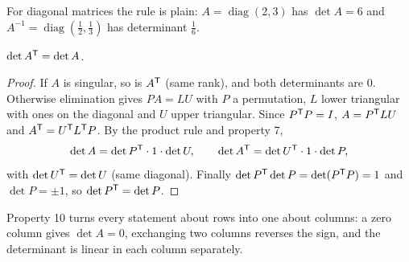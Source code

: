 For diagonal matrices the rule is plain: $A=\operatorname{diag}(2,3)$ has $\det A=6$ and
$A^{-1}=\operatorname{diag}(\frac12,\frac13)$ has determinant $\frac16$.

\begin{theorem}\label{thm:u20-transpose}
$\det A^{\mathsf{T}}=\det A$.
\end{theorem}

\begin{proof}
If $A$ is singular, so is $A^{\mathsf{T}}$ (same rank), and both determinants are $0$. Otherwise
elimination gives $PA=LU$ with $P$ a permutation, $L$ lower triangular with ones on the
diagonal and $U$ upper triangular. Since $P^{\mathsf{T}} P=I$, $A=P^{\mathsf{T}} LU$ and $A^{\mathsf{T}}=U^{\mathsf{T}} L^{\mathsf{T}} P$. By the
product rule and property 7,
\[
  \det A=\det P^{\mathsf{T}}\cdot 1\cdot\det U,\qquad \det A^{\mathsf{T}}=\det U^{\mathsf{T}}\cdot 1\cdot\det P ,
\]
with $\det U^{\mathsf{T}}=\det U$ (same diagonal). Finally $\det P^{\mathsf{T}}\det P=\det(P^{\mathsf{T}} P)=1$ and
$\det P=\pm1$, so $\det P^{\mathsf{T}}=\det P$.
\end{proof}

Property 10 turns every statement about rows into one about columns: a zero column gives
$\det A=0$, exchanging two columns reverses the sign, and the determinant is linear in each
column separately.

